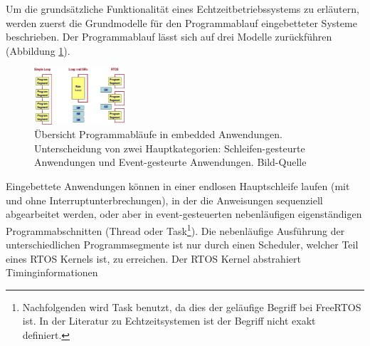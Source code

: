 Um die grund\-sätz\-liche Funktionalität eines Echtzeitbetriebssystems zu erläutern, werden zuerst die Grundmodelle für den Programmablauf eingebetteter Systeme beschrieben. Der Programmablauf lässt sich auf drei Modelle zu\-rück\-füh\-ren\cite{RTOSRevealed} (Abbildung \ref{fig:Programmablauf}). 
\begin{figure}[ht]
	\centering
		\includegraphics[width=0.3\textwidth]{Pictures/EmbeddedCom/cwrtos2f5c.jpg}
	\caption{Übersicht Programmabläufe in embedded Anwendungen. Unterscheidung von zwei Hauptkategorien: Schleifen-gesteurte Anwendungen und Event-gesteurte Anwendungen. Bild-Quelle~\protect{}}
	\label{fig:Programmablauf}
\end{figure}
Eingebettete Anwendungen können in einer endlosen Hauptschleife laufen (mit und ohne Interruptunterbrechungen), in der die Anweisungen sequenziell abgearbeitet werden, oder aber in event-gesteuerten ne\-ben\-läuf\-igen ei\-gen\-stän\-dig\-en Pro\-gramm\-ab\-schnit\-ten (Thre\-ad oder Task\footnote{Nachfolgenden wird Task benutzt, da dies der geläufige Begriff bei FreeRTOS ist. In der Literatur zu Echtzeitsystemen ist der Begriff nicht exakt definiert.}). Die ne\-ben\-läuf\-ige Aus\-füh\-rung der unterschiedlichen Programmsegmente ist nur durch einen Scheduler, welcher Teil eines RTOS Kernels ist, zu erreichen. Der RTOS Kernel abstrahiert Timinginformationen\cite{MasteringFreeRtos} 
